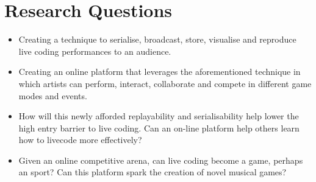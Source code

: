\documentclass[12pt]{article}
\begin{document}
\section*{Research Questions}

\begin{itemize}

\item
Creating a technique to serialise, broadcast, store, visualise and reproduce live coding performances to an audience.

\item
Creating an online platform that leverages the aforementioned technique in which artists can perform, interact, collaborate and compete in different game modes and events.

\item
How will this newly afforded replayability and serialisability help lower the high entry barrier to live coding. Can an on-line platform help others learn how to livecode more effectively?

\item
Given an online competitive arena, can live coding become a game, perhaps an sport? Can this platform spark the creation of novel musical games?
\end{itemize}

\printbibliography
\end{document}
